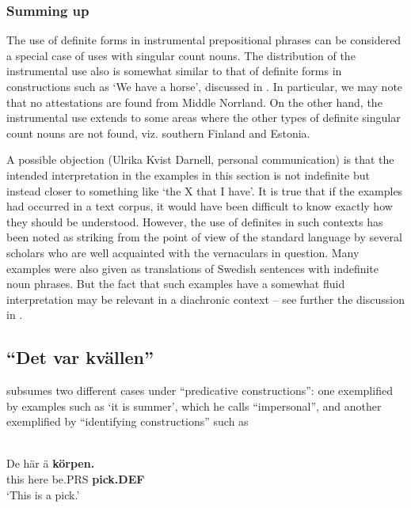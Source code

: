 \z

\subsubsection{Summing up}
 The use of definite forms in instrumental prepositional phrases can be considered a special case of uses with singular count nouns. The distribution of the instrumental use also is somewhat similar to that of definite forms in constructions such as ‘We have a horse’, discussed in . In particular, we may note that no attestations are found from Middle Norrland. On the other hand, the instrumental use extends to some areas where the other types of definite singular count nouns are not found, viz. southern Finland and Estonia. 

A possible objection (Ulrika Kvist Darnell, personal communication) is that the intended interpretation in the examples in this section is not indefinite but instead closer to something like ‘the X that I have’. It is true that if the examples had occurred in a text corpus, it would have been difficult to know exactly how they should be understood. However, the use of definites in such contexts has been noted as striking from the point of view of the standard language by several scholars who are well acquainted with the vernaculars in question. Many examples were also given as translations of Swedish sentences with indefinite noun phrases. But the fact that such examples have a somewhat fluid interpretation may be relevant in a diachronic context – see further the discussion in . 

\subsection{  “Det var kvällen”}
\label{bkm:Ref224379336}

\citet[16]{Delsing2003a} subsumes two different cases under “predicative constructions”: one exemplified by examples such as  ‘it is summer’, which he calls “impersonal”, and another exemplified by “identifying constructions” such as 

\ea \label{} 
\\
\gll De  här  ä  \textbf{körpen.}\\
this  here  be.PRS  \textbf{pick.DEF}\\
\glt ‘This is a pick.’

\z


